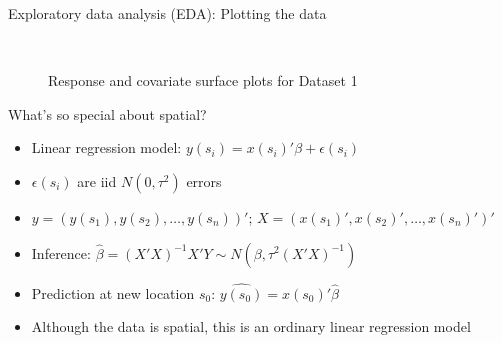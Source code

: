 \documentclass[xcolor=pdftex,dvipsnames,table,numbers,hyperref={pdfpagelabels=false},compress]{beamer}
\newcommand{\blue}[1]{{\color{RoyalBlue!90} #1}}
\newcommand{\red}[1]{{\color{Red} #1}}
\newcommand{\eps}{\epsilon}
\begin{document}
\begin{frame}{Exploratory data analysis (EDA): Plotting the data}
\begin{figure}
	\\
	\caption{Response and covariate surface plots for Dataset 1}
\end{figure}
\end{frame}

\begin{frame}{What's so special about spatial?}
	\begin{itemize}
		\item Linear regression model: $y(s_i)=x(s_i)'\beta + \eps(s_i)$
		\item $\eps(s_i)$ are iid $N(0,\tau^2)$ errors 
		\item $y=(y(s_1),y(s_2),\ldots,y(s_n))'$;  $X=(x(s_1)',x(s_2)',\ldots,x(s_n)')'$
		\item \blue{Inference:} $\hat\beta = (X'X)^{-1}X'Y \sim N(\beta, \tau^2 (X'X)^{-1})$
		\item \blue{Prediction} at new location $s_0$: $\widehat{y(s_0)} = x(s_0)'\hat\beta$
		\item Although the data is spatial, this is an \red{ordinary linear regression} model
	\end{itemize}
\end{frame}
\end{document}
